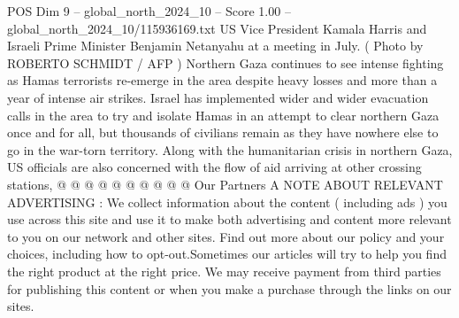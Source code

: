 \begin{textsample}{POS Dim 9 – global\_north\_2024\_10 – Score 1.00 – global\_north\_2024\_10/115936169.txt}
US Vice President Kamala Harris and Israeli Prime Minister Benjamin Netanyahu at a meeting in July. ( Photo by ROBERTO SCHMIDT / AFP ) Northern Gaza continues to see intense fighting as Hamas terrorists re-emerge in the area despite heavy losses and more than a year of intense air strikes.
Israel has implemented wider and wider evacuation calls in the area to try and isolate Hamas in an attempt to clear northern Gaza once and for all, but thousands of civilians remain as they have nowhere else to go in the war-torn territory.
Along with the humanitarian crisis in northern Gaza, US officials are also concerned with the flow of aid arriving at other crossing stations, @ @ @ @ @ @ @ @ @ @ Our Partners A NOTE ABOUT RELEVANT ADVERTISING : We collect information about the content ( including ads ) you use across this site and use it to make both advertising and content more relevant to you on our network and other sites.
Find out more about our policy and your choices, including how to opt-out.Sometimes our articles will try to help you find the right product at the right price.
We may receive payment from third parties for publishing this content or when you make a purchase through the links on our sites.

\end{textsample}
